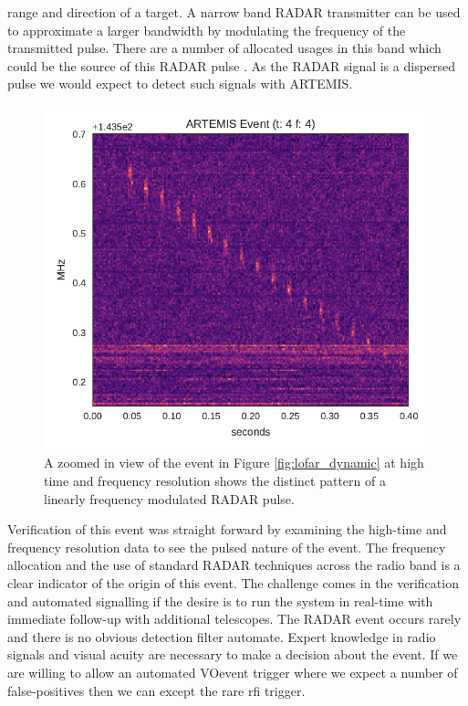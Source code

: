 \documentclass[a4paper,fleqn,usenatbib]{mnras}
\begin{document}
range and direction of a target. A narrow band RADAR transmitter can be used to
approximate a larger bandwidth by modulating the frequency of the transmitted
pulse. There are a number of allocated usages in this band which could be the
source of this RADAR pulse \citep{ofcom2017}.  As the RADAR signal is a
dispersed pulse we would expect to detect such signals with ARTEMIS.
%
\begin{figure}
    \includegraphics[width=1.0\linewidth]{figures/LOFAR_dynamic_high_res.pdf}
    \caption{A zoomed in view of the event in Figure \ref{fig:lofar_dynamic} at
    high time and frequency resolution shows the distinct pattern of a linearly frequency
    modulated RADAR pulse.
    }
    \label{fig:lofar_dynamic_high}
\end{figure}
%
Verification of this event was straight forward by examining the high-time and
frequency resolution data to see the pulsed nature of the event. The frequency
allocation and the use of standard RADAR techniques across the radio band is a
clear indicator of the origin of this event. The challenge comes in the
verification and automated signalling if the desire is to run the system in
real-time with immediate follow-up with additional telescopes. The RADAR event
occurs rarely and there is no obvious detection filter automate. Expert
knowledge in radio signals and visual acuity are necessary to make a decision
about the event. If we are willing to allow an automated VOevent trigger where
we expect a number of false-positives then we can except the rare
\gls{rfi} trigger.
\end{document}
